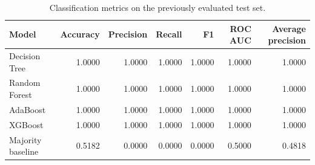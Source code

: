\begin{table}[H]
\centering\small
\caption{Classification metrics on the previously evaluated test set.}
\begin{tabular}{lrrrrrr}
\toprule
Model & Accuracy & Precision & Recall & F1 & ROC AUC & Average precision \\
\midrule
Decision Tree & 1.0000 & 1.0000 & 1.0000 & 1.0000 & 1.0000 & 1.0000 \\
Random Forest & 1.0000 & 1.0000 & 1.0000 & 1.0000 & 1.0000 & 1.0000 \\
AdaBoost & 1.0000 & 1.0000 & 1.0000 & 1.0000 & 1.0000 & 1.0000 \\
XGBoost & 1.0000 & 1.0000 & 1.0000 & 1.0000 & 1.0000 & 1.0000 \\
Majority baseline & 0.5182 & 0.0000 & 0.0000 & 0.0000 & 0.5000 & 0.4818 \\
\bottomrule
\end{tabular}
\end{table}
